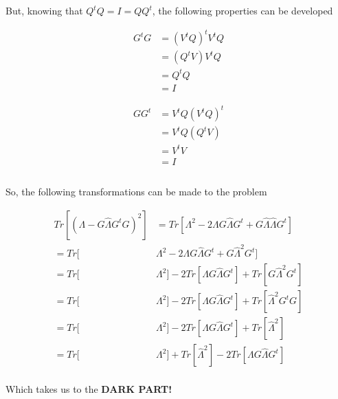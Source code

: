 \documentclass[12pt,journal]{IEEEtran}
\begin{document}
    But, knowing that $Q^tQ = I = QQ^t$, the following properties can be developed

    \begin{equation*}
        \begin{aligned}
            G^tG &= (V^tQ)^t V^tQ\\
                 &= (Q^tV) V^tQ\\
                 &= Q^tQ\\
                 &= I
        \end{aligned}
    \end{equation*}

    \begin{equation*}
        \begin{aligned}
            GG^t &= V^tQ (V^tQ)^t\\
                 &= V^tQ (Q^tV)\\
                 &= V^tV\\
                 &= I\\ \\
        \end{aligned}
    \end{equation*}

    So, the following transformations can be made to the problem

    \begin{equation*}
        \begin{aligned}
        Tr[(\Lambda - G \hat{\Lambda} G^t G)^2 ]
        &=
        Tr[\Lambda^2 - 2 \Lambda G \hat{\Lambda} G^t + G \hat{\Lambda} \hat{\Lambda} G^t]\\
        =
        Tr[&\Lambda^2 - 2 \Lambda G \hat{\Lambda} G^t + G \hat{\Lambda}^2 G^t]\\
        =
        Tr[&\Lambda^2]- 2 Tr[\Lambda G \hat{\Lambda} G^t] + Tr[G \hat{\Lambda}^2 G^t]\\
        =
        Tr[&\Lambda^2] - 2 Tr[\Lambda G \hat{\Lambda} G^t] + Tr[ \hat{\Lambda}^2 G^tG]\\
        =
        Tr[&\Lambda^2] - 2 Tr[\Lambda G \hat{\Lambda} G^t] + Tr[ \hat{\Lambda}^2]\\
        =
        Tr[&\Lambda^2] + Tr[ \hat{\Lambda}^2] - 2 Tr[\Lambda G \hat{\Lambda} G^t]\\
        \end{aligned}
    \end{equation*}

    Which takes us to the \textbf{DARK PART!}\\
\end{document}

